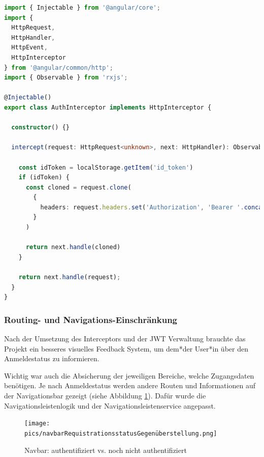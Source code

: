 \begin{lstlisting}[caption=auth.interceptor.ts - add JWT to Request Header,label=lst:impl:sign:JWTInterceptor,language=TypeScript]
import { Injectable } from '@angular/core';
import {
  HttpRequest,
  HttpHandler,
  HttpEvent,
  HttpInterceptor
} from '@angular/common/http';
import { Observable } from 'rxjs';

@Injectable()
export class AuthInterceptor implements HttpInterceptor {

  constructor() {}

  intercept(request: HttpRequest<unknown>, next: HttpHandler): Observable<HttpEvent<unknown>> {

    const idToken = localStorage.getItem('id_token')
    if (idToken) {
      const cloned = request.clone(
        {
          headers: request.headers.set('Authorization', 'Bearer '.concat(idToken))
        }
      )

      return next.handle(cloned)
    }

    return next.handle(request);
  }
}
\end{lstlisting}

\subsubsection{Routing- und Navigations-Einschränkung}
Nach der Umsetzung des Interceptors und der JWT Verwaltung brauchte das Projekt ein besseres visuelles Feedback System, um dem*der User*in über den Anmeldestatus zu informieren.

Wichtig war auch die Absicherung der jeweiligen Bereiche, welche Zugangsdaten benötigen. Je nach Anmeldestatus werden andere Routen und Informationen auf der Navigationsbar gezeigt (siehe Abbildung \ref{fig:impl:navbarvergleich}). Dafür wurde die Navigationsleistenlogik und der Navigationsleistenservice angepasst.

\begin{figure}
  \centering
  \texttt{[image: pics/navbarRequistrationsstatusGegenüberstellung.png]}
  \caption{Navbar: authentifiziert vs. noch nicht authentifiziert}
  \label{fig:impl:navbarvergleich}
\end{figure}


